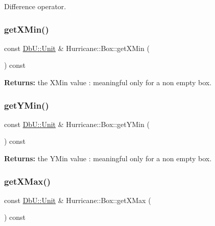 Difference operator. \mbox{\label{classHurricane_1_1Box_ad5122ef7dda8a58c1dacddb57cd4ccfb}} 
\subsubsection{\texorpdfstring{get\+X\+Min()}{getXMin()}}
{\footnotesize\ttfamily const \mbox{\hyperlink{group__DbUGroup_ga4fbfa3e8c89347af76c9628ea06c4146}{Db\+U\+::\+Unit}} \& Hurricane\+::\+Box\+::get\+X\+Min (\begin{DoxyParamCaption}{ }\end{DoxyParamCaption}) const\hspace{0.3cm}{\ttfamily [inline]}}

{\bfseries Returns\+:} the X\+Min value \+: meaningful only for a non empty box. \mbox{\label{classHurricane_1_1Box_a542c383466845aeca0e32f51b77c7439}} 
\subsubsection{\texorpdfstring{get\+Y\+Min()}{getYMin()}}
{\footnotesize\ttfamily const \mbox{\hyperlink{group__DbUGroup_ga4fbfa3e8c89347af76c9628ea06c4146}{Db\+U\+::\+Unit}} \& Hurricane\+::\+Box\+::get\+Y\+Min (\begin{DoxyParamCaption}{ }\end{DoxyParamCaption}) const\hspace{0.3cm}{\ttfamily [inline]}}

{\bfseries Returns\+:} the Y\+Min value \+: meaningful only for a non empty box. \mbox{\label{classHurricane_1_1Box_a77b9db757080544fcede3e670cee8c5c}} 
\subsubsection{\texorpdfstring{get\+X\+Max()}{getXMax()}}
{\footnotesize\ttfamily const \mbox{\hyperlink{group__DbUGroup_ga4fbfa3e8c89347af76c9628ea06c4146}{Db\+U\+::\+Unit}} \& Hurricane\+::\+Box\+::get\+X\+Max (\begin{DoxyParamCaption}{ }\end{DoxyParamCaption}) const\hspace{0.3cm}{\ttfamily [inline]}}

